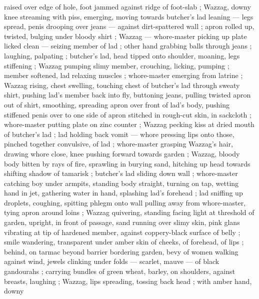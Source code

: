 raised over edge of hole, foot jammed against ridge of foot-slab ; Wazzag, downy knee streaming with piss, emerging, moving towards butcher's lad leaning --- legs spread, penis drooping over jeans --- against dirt-spattered wall ; apron rolled up, twisted, bulging under bloody shirt ; Wazzag --- whore-master picking up plate licked clean --- seizing member of lad ; other hand grabbing balls through jeans ; laughing, palpating ; butcher's lad, head tipped onto shoulder, moaning, legs stiffening ; Wazzag pumping slimy member, crouching, licking, pumping ; member softened, lad relaxing muscles ; whore-master emerging from latrine ; Wazzag rising, chest swelling, touching chest of butcher's lad through sweaty shirt, pushing lad's member back into fly, buttoning jeans, pulling twisted apron out of shirt, smoothing, spreading apron over front of lad's body, pushing stiffened penis over to one side of apron stitched in rough-cut skin, in sackcloth ; whore-master putting plate on zinc counter ; Wazzag pecking kiss at dried mouth of butcher's lad ; lad holding back vomit --- whore pressing lips onto those, pinched together convulsive, of lad ; whore-master grasping Wazzag's hair, drawing whore close, knee pushing forward towards garden ; Wazzag, bloody body bitten by rays of fire, sprawling in burying sand, hitching up head towards shifting shadow of tamarisk ; butcher's lad sliding down wall ; whore-master catching boy under armpits, standing body straight, turning on tap, wetting hand in jet, gathering water in hand, splashing lad's forehead ; lad sniffing up droplets, coughing, spitting phlegm onto wall pulling away from whore-master, tying apron around loins ; Wazzag quivering, standing facing light at threshold of garden, upright, in front of passage, sand running over slimy skin, pink glans vibrating at tip of hardened member, against coppery-black surface of belly ; smile wandering, transparent under amber skin of cheeks, of forehead, of lips ; behind, on tarmac beyond barrier bordering garden, bevy of women walking against wind, jewels clinking under folds --- scarlet, mauve --- of black gandourahs ; carrying bundles of green wheat, barley, on shoulders, against breasts, laughing ; Wazzag, lips spreading, tossing back head ; with amber hand, downy 
